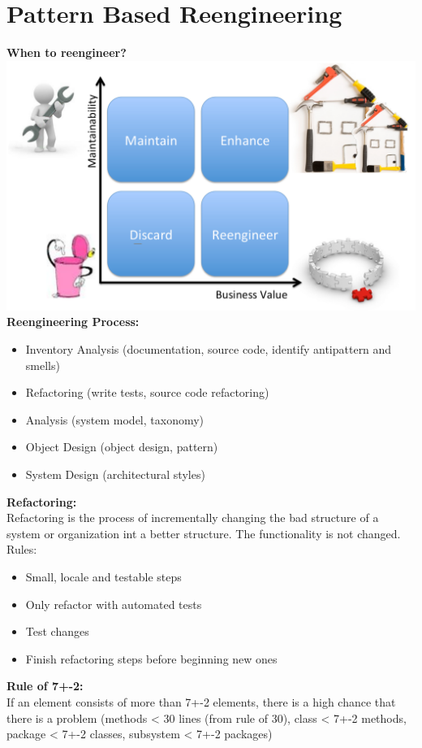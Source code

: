 
\section{Pattern Based Reengineering}
\textbf{When to reengineer?}\\
\includegraphics[width=.75\linewidth]{images/reengineering_when.png}\\

\textbf{Reengineering Process:}
\begin{itemize}
  \item Inventory Analysis (documentation, source code, identify antipattern and smells)\
  \item Refactoring (write tests, source code refactoring)
  \item Analysis (system model, taxonomy)
  \item Object Design (object design, pattern)
  \item System Design (architectural styles)
\end{itemize}

\textbf{Refactoring:}\\
Refactoring is the process of incrementally changing the bad structure of a system or organization int a better structure.
The functionality is not changed.\\
Rules:
\begin{itemize}
  \item Small, locale and testable steps
  \item Only refactor with automated tests
  \item Test changes
  \item Finish refactoring steps before beginning new ones
\end{itemize}

\textbf{Rule of 7+-2:}\\
If an element consists of more than 7+-2 elements, there is a high chance that there is a problem (methods < 30 lines (from rule of 30), class < 7+-2 methods, package < 7+-2 classes, subsystem < 7+-2 packages)
\newpage

